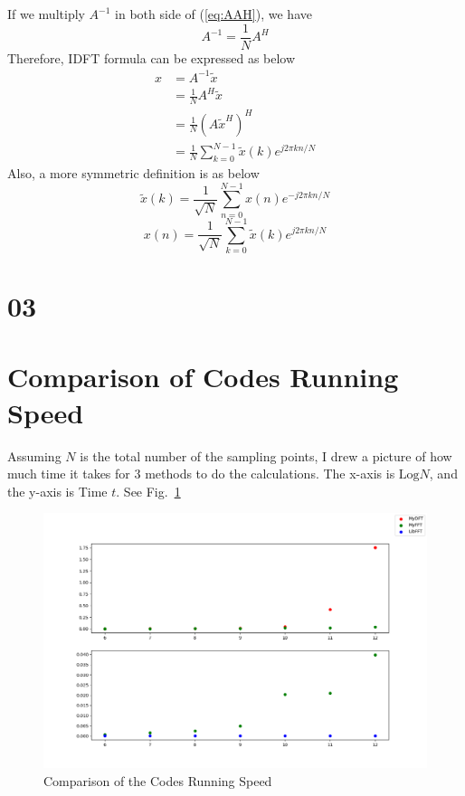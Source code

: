 \documentclass{article}
\begin{document}
If we multiply $A^{-1}$ in both side of (\ref{eq:AAH}), we have
\begin{equation}
    A^{-1} = \frac1N A^H
\label{eq:A-1}
\end{equation}
Therefore, IDFT formula can be expressed as below
\begin{equation}
    \begin{aligned}
        x &= A^{-1} \tilde{x}\\ 
        &= \frac1N A^H \tilde{x} \\ 
        &= \frac{1}{N} (A \tilde{x}^H)^H \\ 
        &= \frac{1}{N} \sum^{N - 1}_{k = 0} \tilde{x}(k)e^{j2\pi kn /N}
    \end{aligned}
\end{equation}
Also, a more symmetric definition is as below
$$
    \tilde{x}(k) = \frac{1}{\sqrt{N}} \sum_{n = 0}^{N - 1} x(n) e^{-j 2\pi kn/N}
$$
$$
    x(n) = \frac{1}{\sqrt{N}} \sum_{k = 0}^{N - 1} \tilde{x}(k) e^{j 2\pi kn/N}
$$
\section{03}

\section{Comparison of Codes Running Speed}
Assuming $N$ is the total number of the sampling points, I drew a picture of how much time it takes for 3 methods to do the calculations. The x-axis is $\mathrm{Log}N$, and the y-axis is Time $t$. See Fig.~\ref{fig:speedtest}

\begin{figure}[!h]
    \centering
    \includegraphics[width=5 in]{../pic/speedtest.png}
    \caption{Comparison of the Codes Running Speed}
    \label{fig:speedtest}
\end{figure}
\end{document}
